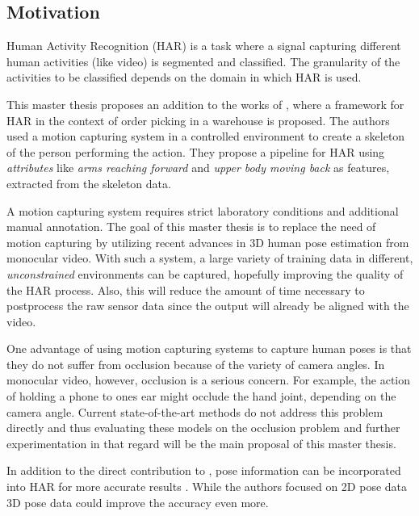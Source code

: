 \documentclass[twoside]{article}
\begin{document}
\begin{multicols}{2} %

\section{Motivation}
\label{sec:motivation}
Human Activity Recognition (HAR) is a task where a signal capturing different human activities (like video) is segmented and classified.
The granularity of the activities to be classified depends on the domain in which HAR is used. 

This master thesis proposes an addition to the works of \cite{reining_towards_2018}, where a framework for HAR in the context of order picking in a warehouse is proposed.
The authors used a motion capturing system in a controlled environment to create a skeleton of the person performing the action.
They propose a pipeline for HAR using \textit{attributes} like \textit{arms reaching forward} and \textit{upper body moving back} as features, extracted from the skeleton data.

A motion capturing system requires strict laboratory conditions and additional manual annotation.
The goal of this master thesis is to replace the need of motion capturing by utilizing recent advances in 3D human pose estimation from monocular video.
With such a system, a large variety of training data in different, \textit{unconstrained} environments can be captured, hopefully improving the quality of the HAR process.
Also, this will reduce the amount of time necessary to postprocess the raw sensor data since the output will already be aligned with the video.

One advantage of using motion capturing systems to capture human poses is that they do not suffer from occlusion because of the variety of camera angles.
In monocular video, however, occlusion is a serious concern.
For example, the action of holding a phone to ones ear might occlude the hand joint, depending on the camera angle.
Current state-of-the-art methods do not address this problem directly and thus evaluating these models on the occlusion problem and further experimentation in that regard will be the main proposal of this master thesis.

In addition to the direct contribution to \cite{reining_towards_2018}, pose information can be incorporated into HAR for more accurate results \cite{khalid_multi-modal_2018}.
While the authors focused on 2D pose data 3D pose data could improve the accuracy even more. 


\end{multicols}
\end{document}

